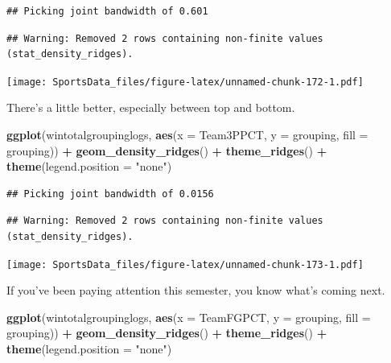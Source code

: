 \documentclass[
]{book}
\newenvironment{Shaded}{\begin{snugshade}}{\end{snugshade}}
\newcommand{\DataTypeTok}[1]{\textcolor[rgb]{0.13,0.29,0.53}{#1}}
\newcommand{\KeywordTok}[1]{\textcolor[rgb]{0.13,0.29,0.53}{\textbf{#1}}}
\newcommand{\NormalTok}[1]{#1}
\newcommand{\OperatorTok}[1]{\textcolor[rgb]{0.81,0.36,0.00}{\textbf{#1}}}
\newcommand{\StringTok}[1]{\textcolor[rgb]{0.31,0.60,0.02}{#1}}
\begin{document}
\begin{verbatim}
## Picking joint bandwidth of 0.601
\end{verbatim}

\begin{verbatim}
## Warning: Removed 2 rows containing non-finite values (stat_density_ridges).
\end{verbatim}

\texttt{[image: SportsData\_files/figure-latex/unnamed-chunk-172-1.pdf]}

There's a little better, especially between top and bottom.

\begin{Shaded}
\begin{Highlighting}[]
\KeywordTok{ggplot}\NormalTok{(wintotalgroupinglogs, }\KeywordTok{aes}\NormalTok{(}\DataTypeTok{x =}\NormalTok{ Team3PPCT, }\DataTypeTok{y =}\NormalTok{ grouping, }\DataTypeTok{fill =}\NormalTok{ grouping)) }\OperatorTok{+}
\StringTok{  }\KeywordTok{geom_density_ridges}\NormalTok{() }\OperatorTok{+}
\StringTok{  }\KeywordTok{theme_ridges}\NormalTok{() }\OperatorTok{+}\StringTok{ }
\StringTok{  }\KeywordTok{theme}\NormalTok{(}\DataTypeTok{legend.position =} \StringTok{"none"}\NormalTok{)}
\end{Highlighting}
\end{Shaded}

\begin{verbatim}
## Picking joint bandwidth of 0.0156
\end{verbatim}

\begin{verbatim}
## Warning: Removed 2 rows containing non-finite values (stat_density_ridges).
\end{verbatim}

\texttt{[image: SportsData\_files/figure-latex/unnamed-chunk-173-1.pdf]}

If you've been paying attention this semester, you know what's coming next.

\begin{Shaded}
\begin{Highlighting}[]
\KeywordTok{ggplot}\NormalTok{(wintotalgroupinglogs, }\KeywordTok{aes}\NormalTok{(}\DataTypeTok{x =}\NormalTok{ TeamFGPCT, }\DataTypeTok{y =}\NormalTok{ grouping, }\DataTypeTok{fill =}\NormalTok{ grouping)) }\OperatorTok{+}
\StringTok{  }\KeywordTok{geom_density_ridges}\NormalTok{() }\OperatorTok{+}
\StringTok{  }\KeywordTok{theme_ridges}\NormalTok{() }\OperatorTok{+}\StringTok{ }
\StringTok{  }\KeywordTok{theme}\NormalTok{(}\DataTypeTok{legend.position =} \StringTok{"none"}\NormalTok{)}
\end{Highlighting}
\end{Shaded}
\end{document}
